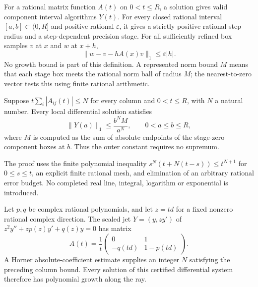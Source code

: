 \begin{definition}
\label{def:fuchs-local-solution}
For a rational matrix function $A(t)$ on $0<t\le R$, a solution gives valid
component interval algorithms $Y(t)$. For every closed rational interval
$[a,b]\subset(0,R]$ and positive rational $\varepsilon$, it gives a strictly
positive rational step radius and a step-dependent precision stage. For
all sufficiently refined box samples $v$ at $x$ and $w$ at $x+h$,
\[
 \|w-v-hA(x)v\|_1\le\varepsilon|h|.
\]
No growth bound is part of this definition. A represented norm bound $M$
means that each stage box meets the rational norm ball of radius $M$;
the nearest-to-zero vector tests this using finite rational arithmetic.
\leanok
\end{definition}

\begin{theorem}
\label{thm:fuchs-matrix-growth}
Suppose $t\sum_i|A_{ij}(t)|\le N$ for every column and $0<t\le R$, with
$N$ a natural number. Every local differential solution satisfies
\[
 \|Y(a)\|_1\le\frac{b^N M}{a^N},\qquad 0<a\le b\le R,
\]
where $M$ is computed as the sum of absolute endpoints of the stage-zero
component boxes at $b$. Thus the outer constant requires no supremum.
\leanok
\end{theorem}

The proof uses the finite polynomial inequality
$s^N(t+N(t-s))\le t^{N+1}$ for $0\le s\le t$, an explicit finite rational
mesh, and elimination of an arbitrary rational error budget. No completed
real line, integral, logarithm or exponential is introduced.
\leanok

\begin{theorem}
\label{thm:fuchs-ray-growth}
Let $p,q$ be complex rational polynomials, and let $z=td$ for a fixed
nonzero rational complex direction. The scaled jet $Y=(y,zy')$ of
$z^2y''+zp(z)y'+q(z)y=0$ has matrix
\[
 A(t)=\frac1t\begin{pmatrix}0&1\\-q(td)&1-p(td)\end{pmatrix}.
\]
A Horner absolute-coefficient estimate supplies an integer $N$ satisfying
the preceding column bound. Every solution of this certified differential
system therefore has polynomial growth along the ray.
\leanok
\end{theorem}

